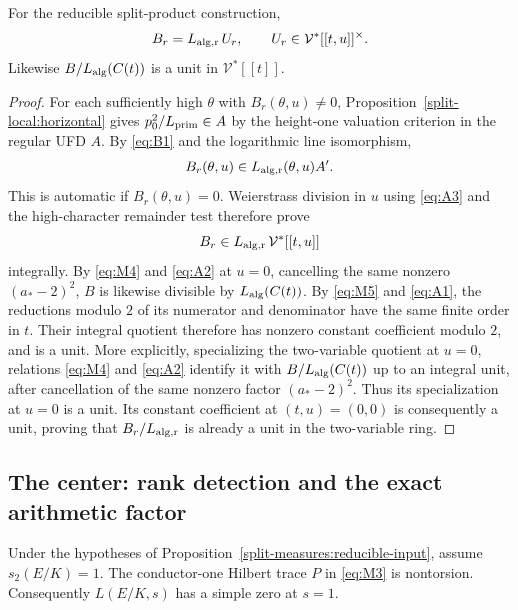 \begin{corollary}\label{split-local:unit}
For the reducible split-product construction,
\[
 B_r=L_{\rm alg,r}\,U_r,
 \qquad U_r\in\mathcal V^*[[t,u]]^\times.
\]
Likewise \(B/L_{\rm alg}(C(t))\) is a unit in \(\mathcal V^*[[t]]\).
\end{corollary}

\begin{proof}

For each sufficiently high \(\theta\) with \(B_r(\theta,u)\ne0\), Proposition~\ref{split-local:horizontal} gives \(p_0^2/L_{\rm prim}\in A\) by the height-one valuation criterion in the regular UFD \(A\). By \eqref{eq:B1} and the logarithmic line isomorphism,
\[
                          B_r(\theta,u)\in L_{\rm alg,r}(\theta,u) A'.
\]
This is automatic if \(B_r(\theta,u)=0\). Weierstrass division in \(u\) using \eqref{eq:A3} and the high-character remainder test therefore prove
\[
                          B_r\in L_{\rm alg,r}\,\mathcal V^*[[t,u]]
\]
integrally. By \eqref{eq:M4} and \eqref{eq:A2} at \(u=0\), cancelling the same nonzero \((a_*-2)^2\), \(B\) is likewise divisible by \(L_{\rm alg}(C(t))\). By \eqref{eq:M5} and \eqref{eq:A1}, the reductions modulo \(2\) of its numerator and denominator have the same finite order in \(t\). Their integral quotient therefore has nonzero constant coefficient modulo \(2\), and is a unit. More explicitly, specializing the two-variable quotient at \(u=0\), relations \eqref{eq:M4} and \eqref{eq:A2} identify it with \(B/L_{\rm alg}(C(t))\) up to an integral unit, after cancellation of the same nonzero factor \((a_*-2)^2\). Thus its specialization at \(u=0\) is a unit. Its constant coefficient at \((t,u)=(0,0)\) is consequently a unit, proving that \(B_r/L_{\rm alg,r}\) is already a unit in the two-variable ring.
\end{proof}

\subsection{The center: rank detection and the exact arithmetic factor}

\begin{proposition}\label{split-local:center-rank}
Under the hypotheses of Proposition~\ref{split-measures:reducible-input}, assume \(s_2(E/K)=1\). The conductor-one Hilbert trace \(P\) in \eqref{eq:M3} is nontorsion. Consequently \(L(E/K,s)\) has a simple zero at \(s=1\).
\end{proposition}

